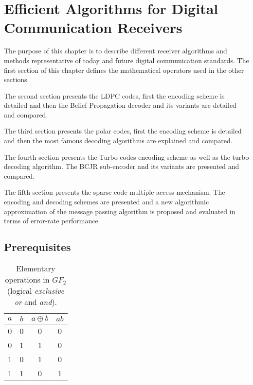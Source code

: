 
\graphicspath{{main/chapter2/fig/}}

\chapter{Efficient Algorithms for Digital Communication Receivers}
\label{chap:alg}

The purpose of this chapter is to describe different receiver algorithms and
methods representative of today and future digital communication standards.
The first section of this chapter defines the mathematical operators used in the
other sections.

The second section presents the LDPC codes, first the encoding scheme is
detailed and then the Belief Propagation decoder and its variants are detailed
and compared.

The third section presents the polar codes, first the encoding scheme is
detailed and then the most famous decoding algorithms are explained and
compared.

The fourth section presents the Turbo codes encoding scheme as well as the turbo
decoding algorithm. The BCJR sub-encoder and its variants are presented and
compared.

The fifth section presents the sparse code multiple access mechanism. The
encoding and decoding schemes are presented and a new algorithmic approximation
of the message passing algorithm is proposed and evaluated in terms of
error-rate performance.

\vspace*{\fill}
\minitoccustom
\vspace*{\fill}

\section{Prerequisites}

\begin{table}[htp]
  \centering
  \caption{Elementary operations in $GF_2$ (logical \emph{exclusive or} and
    \emph{and}).}
  \label{tab:ctx_gf2_operations}
   \begin{tabular}{c c c c}
   $a$ & $b$ & $a \oplus b$ & $ab$ \\
    \hline
    \hline
    0 & 0 & 0 & 0 \\
    0 & 1 & 1 & 0 \\
    1 & 0 & 1 & 0 \\
    1 & 1 & 0 & 1 \\
  \end{tabular}
\end{table}

